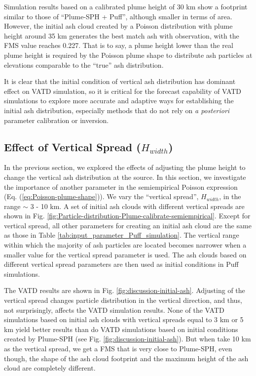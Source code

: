 \documentclass[utf8]{frontiersSCNS} %
\begin{document}
Simulation results based on a calibrated plume height of 30 km show a footprint similar to those of ``Plume-SPH + Puff'', although smaller in terms of area. However, the initial ash cloud created by a Poisson distribution with plume height around 35 km generates the best match ash with observation, with the FMS value reaches 0.227.  That is to say, a plume height lower than the real plume height is required by the Poisson plume shape to distribute ash particles at elevations comparable to the ``true'' ash distribution. 

It is clear that the initial condition of vertical ash distribution has dominant effect on VATD simulation, so it is critical for the forecast capability of VATD simulations to explore more accurate and adaptive ways for establishing the initial ash distribution, especially methods that do not rely on \textit{a posteriori} parameter calibration or inversion.

\subsection{Effect of Vertical Spread ($H_{width}$)}
In the previous section, we explored the effects of adjusting the plume height to change the vertical ash distribution at the source. In this section, we investigate the importance of another parameter in the semiempirical Poisson expression (Eq. (\ref{eq:Poisson-plume-shape})). We vary the ``vertical spread'', $H_{width}$, in the range $\sim$ 3 - 10 km. A set of initial ash clouds  with different vertical spreads are shown in Fig. \ref{fig:Particle-distribution-Plume-calibrate-semiempirical}. Except for vertical spread, all other parameters for creating an initial ash cloud are the same as those in Table \ref{tab:input_parameter_Puff_simulation}. The vertical range within which the majority of ash particles are located becomes narrower when a smaller value for the vertical spread parameter is used. The ash clouds based on different vertical spread parameters are then used as initial conditions in Puff simulations.

The VATD results are shown in Fig. \ref{fig:discussion-initial-ash}. Adjusting of the vertical spread changes particle distribution in the vertical direction, and thus, not surprisingly, affects the VATD simulation results. None of the VATD simulations based on initial ash clouds with vertical spreads equal to 3 km or 5 km yield better results than do VATD simulations based on initial conditions created by Plume-SPH (see Fig. \ref{fig:discussion-initial-ash}). But when take 10 km as the vertical spread, we get a FMS that is very close to Plume-SPH, even though, the shape of the ash cloud footprint and the maximum height of the ash cloud are completely different.
\end{document}
